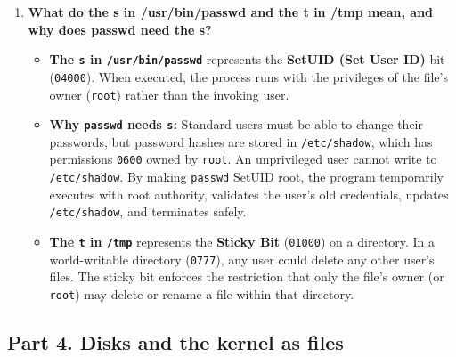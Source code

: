 \documentclass{labreport}
\begin{document}
\begin{enumerate}[leftmargin=*]
    \item \textbf{What do the s in /usr/bin/passwd and the t in /tmp mean, and why does passwd need the s?}\\[0.2em]
    \begin{itemize}[noitemsep, topsep=2pt]
        \item \textbf{The \texttt{s} in \texttt{/usr/bin/passwd}} represents the \textbf{SetUID (Set User ID)} bit (\texttt{04000}). When executed, the process runs with the privileges of the file's owner (\texttt{root}) rather than the invoking user.
        \item \textbf{Why \texttt{passwd} needs \texttt{s}:} Standard users must be able to change their passwords, but password hashes are stored in \texttt{/etc/shadow}, which has permissions \texttt{0600} owned by \texttt{root}. An unprivileged user cannot write to \texttt{/etc/shadow}. By making \texttt{passwd} SetUID root, the program temporarily executes with root authority, validates the user's old credentials, updates \texttt{/etc/shadow}, and terminates safely.
        \item \textbf{The \texttt{t} in \texttt{/tmp}} represents the \textbf{Sticky Bit} (\texttt{01000}) on a directory. In a world-writable directory (\texttt{0777}), any user could delete any other user's files. The sticky bit enforces the restriction that only the file's owner (or \texttt{root}) may delete or rename a file within that directory.
    \end{itemize}
\end{enumerate}

\subsection{Part 4. Disks and the kernel as files}
\end{document}
